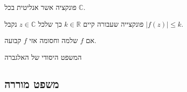 \documentclass{tstextbook}
\begin{document}
\begin{definition}
פונקציה אשר אנליטית בכל \(\mathbb{C}\).

\end{definition}
\begin{definition}
פונקצייה שעבורה קיים \(k \in \mathbb{R}\) כך שלכל \(z \in \mathbb{C}\) נקבל \(\left\lvert  f(z)  \right\rvert\leq k\).

\end{definition}
\begin{theorem}[ליוביל]
אם \(f\) שלמה וחסומה אזי \(f\) קבועה.

\end{theorem}
\begin{corollary}
המשפט היסודי של האלגברה

\end{corollary}
\subsection{משפט מוררה}
\end{document}
